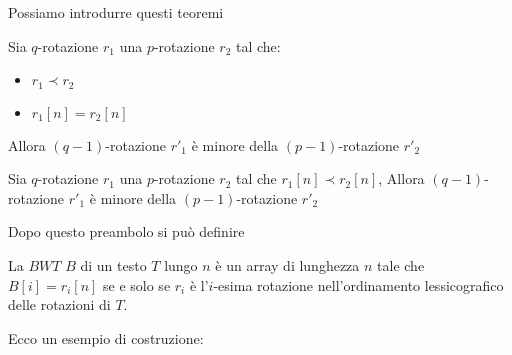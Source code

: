 Possiamo introdurre questi teoremi
\begin{teorema}
    Sia $q$-rotazione $r_1$ una $p$-rotazione $r_2$ tal che:
    \begin{itemize}
        \item $r_1\prec r_2$
        \item $r_1[n]=r_2[n]$
    \end{itemize}
    Allora $(q-1)$-rotazione $r'_1$ è minore della $(p-1)$-rotazione $r'_2$
\end{teorema}
\begin{teorema}
    Sia $q$-rotazione $r_1$ una $p$-rotazione $r_2$ tal che $r_1[n]\prec r_2[n]$,
    Allora $(q-1)$-rotazione $r'_1$ è minore della $(p-1)$-rotazione $r'_2$
\end{teorema}
Dopo questo preambolo si può definire
\begin{definizione}
    La $BWT$ $B$ di un testo $T$ lungo $n$ è un array di lunghezza $n$ tale che
    $B[i]=r_i[n]$ se e solo se $r_i$ è l'$i$-esima rotazione nell'ordinamento
    lessicografico delle rotazioni di $T$.
\end{definizione}
Ecco un esempio di costruzione:
